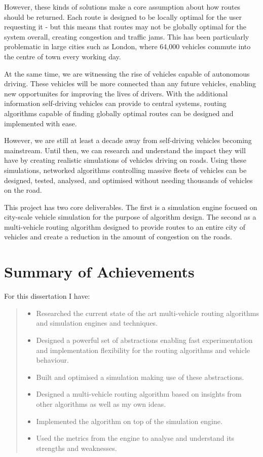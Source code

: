 \documentclass[ %
                    author={Alexander Hill},
                supervisor={Dr. Benjamin Sach},
                    degree={MEng},
                     title={MARMOSET},
                  subtitle={Multi-Agent Route Management using Online Simulation for Efficient Transportation},
                      type={research},
                      year={2016} ]{dissertation}
\begin{document}
However, these kinds of solutions make a core assumption about how routes should
be returned. Each route is designed to be locally optimal for the user
requesting it - but this means that routes may not be globally optimal for the
system overall, creating congestion and traffic jams. This has been particularly
problematic in large cities such as London, where 64,000 vehicles commute into
the centre of town every working day.

At the same time, we are witnessing the rise of vehicles capable of
autonomous driving. These vehicles will be more connected than any future
vehicles, enabling new opportunites for improving the lives of drivers. With the
additional information self-driving vehicles can provide to central systems,
routing algorithms capable of finding globally optimal routes can be designed
and implemented with ease.

However, we are still at least a decade away from self-driving vehicles becoming
mainstream. Until then, we can research and understand the impact they will have
by creating realistic simulations of vehicles driving on roads. Using these
simulations, networked algorithms controlling massive fleets of vehicles can be
designed, tested, analysed, and optimised without needing thousands of vehicles
on the road.

This project has two core deliverables. The first is a simulation engine
focused on city-scale vehicle simulation for the purpose of algorithm design.
The second as a multi-vehicle routing algorithm designed to provide routes to
an entire city of vehicles and create a reduction in the amount of congestion on
the roads.

\section*{Summary of Achievements}

For this dissertation I have:
\begin{quote}
\begin{itemize}
    \item Researched the current state of the art multi-vehicle routing
        algorithms and simulation engines and techniques.
    \item Designed a powerful set of abstractions enabling fast experimentation
        and implementation flexibility for the routing algorithms and vehicle
        behaviour.
    \item Built and optimised a simulation making use of these abstractions.
    \item Designed a multi-vehicle routing algorithm based on insights from
        other algorithms as well as my own ideas.
    \item Implemented the algorithm on top of the simulation engine.
    \item Used the metrics from the engine to analyse and understand its
        strengths and weaknesses.
\end{itemize}
\end{quote}
\end{document}
